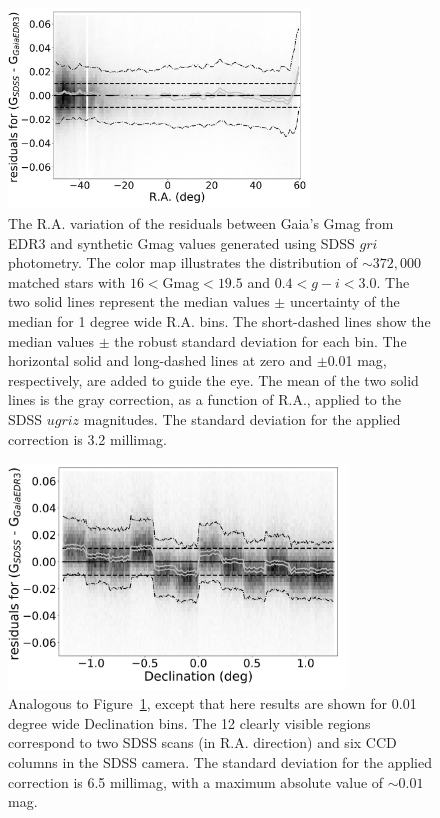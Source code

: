 \documentclass[fleqn,usenatbib]{mnras}
\begin{document}
\begin{figure}[th!]
  \centering\includegraphics[width=8cm]{figures/GmagCorrection_RA_Hess.png} 
\caption{The R.A. variation of the residuals between Gaia's Gmag from EDR3
and synthetic Gmag values generated using SDSS $gri$ photometry. The 
color map illustrates the distribution of $\sim 372,000$ matched stars with 
$16<$Gmag$<19.5$ and $0.4 < g-i < 3.0$. The two solid lines represent the 
median values $\pm$ uncertainty of the median for 1 degree wide R.A. bins. 
The short-dashed lines show the median values $\pm$ the robust standard 
deviation for each bin. The horizontal solid and long-dashed lines at zero and 
$\pm$0.01 mag, respectively, are added to guide the eye. The mean of the two 
solid lines is the gray correction, as a function of R.A., applied to the SDSS 
$ugriz$ magnitudes. The standard deviation for the applied correction is 3.2 millimag.}
\label{fig:graycorrRA}
\end{figure}

\begin{figure}[th!]
    \centering\includegraphics[width=9cm]{figures/GmagCorrection_Dec_Hess.png} 
\caption{Analogous to Figure~\ref{fig:graycorrRA}, except that here results are shown for
0.01 degree wide Declination bins. The 12 clearly visible regions correspond to
two SDSS scans (in R.A. direction) and six CCD columns in the SDSS camera. 
The standard deviation for the applied correction is 6.5 millimag, with a maximum
absolute value of $\sim0.01$ mag.}
\label{fig:graycorrDec}
\end{figure}
\end{document}
